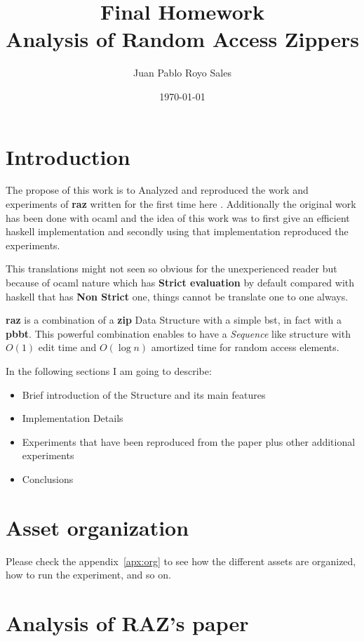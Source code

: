 \documentclass[12pt, a4paper]{article}
\title{%
      Final Homework\\
      Analysis of Random Access Zippers
}
\author{Juan Pablo Royo Sales}
\affil{Universitat Politècnica de Catalunya}
\date\today
\begin{document}
\maketitle

\tableofcontents

\section{Introduction}\label{sec:intro}
The propose of this work is to Analyzed and reproduced the work and experiments of \textbf{\acrfull{raz}} written for the first time here \cite{raz}. Additionally the original work has been done with \acrfull{ocaml} and the idea of this work was to first give an efficient \acrfull{haskell} implementation and secondly using that implementation reproduced the experiments.

This translations might not seen so obvious for the unexperienced reader but because of \acrshort{ocaml} nature which has \textbf{Strict evaluation} by default compared with \acrshort{haskell} that has \textbf{Non Strict} one, things cannot be translate one to one always.

\textbf{\acrfull{raz}} is a combination of a \textbf{\acrfull{zip}} Data Structure with a simple \acrfull{bst}, in fact with a \textbf{\acrfull{pbbt}}. This powerful combination enables to have a \textit{Sequence} like structure with $O(1)$ edit time and $O(\log{n})$ amortized time for random access elements.

In the following sections I am going to describe:

\begin{itemize}
 \item Brief introduction of the Structure and its main features
 \item Implementation Details
 \item Experiments that have been reproduced from the paper plus other additional experiments
 \item Conclusions
\end{itemize}

\section{Asset organization}
Please check the appendix~\ref{apx:org} to see how the different assets are organized, how to run the experiment, and so on.

\section{Analysis of RAZ's paper}
\end{document}
